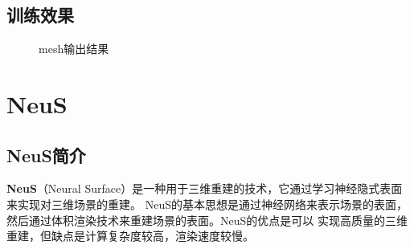 \documentclass{nwputhesis}
\begin{document}
\subsection{训练效果}
\begin{figure}[H]
    \centering
    \hspace{0cm} %
    \caption{mesh输出结果}
\end{figure}
\makespace

\section{NeuS}
\subsection{NeuS简介}
\textbf{NeuS}（Neural Surface）是一种用于三维重建的技术，它通过学习神经隐式表面来实现对三维场景的重建。
NeuS的基本思想是通过神经网络来表示场景的表面，然后通过体积渲染技术来重建场景的表面。NeuS的优点是可以
实现高质量的三维重建，但缺点是计算复杂度较高，渲染速度较慢。
\end{document}
